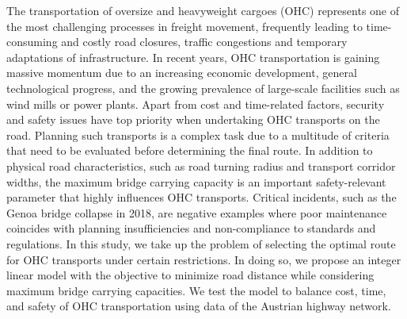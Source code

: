 
The transportation of oversize and heavyweight cargoes (OHC) represents one of the most challenging processes in freight movement, frequently leading to time-consuming and costly road closures, traffic congestions and temporary adaptations of infrastructure. In recent years, OHC transportation is gaining massive momentum due to an increasing economic development, general technological progress, and the growing prevalence of large-scale facilities such as wind mills or power plants. Apart from cost and time-related factors, security and safety issues have top priority when undertaking OHC transports on the road. Planning such transports is a complex task due to a multitude of criteria that need to be evaluated before determining the final route. In addition to physical road characteristics, such as road turning radius and transport corridor widths, the maximum bridge carrying capacity is an important safety-relevant parameter that highly influences OHC transports. Critical incidents, such as the Genoa bridge collapse in 2018, are negative examples where poor maintenance coincides with planning insufficiencies and non-compliance to standards and regulations. In this study, we take up the problem of selecting the optimal route for OHC transports under certain restrictions. In doing so, we propose an integer linear model with the objective to minimize road distance while considering maximum bridge carrying capacities. We test the model to balance cost, time, and safety of OHC transportation using data of the Austrian highway network.
